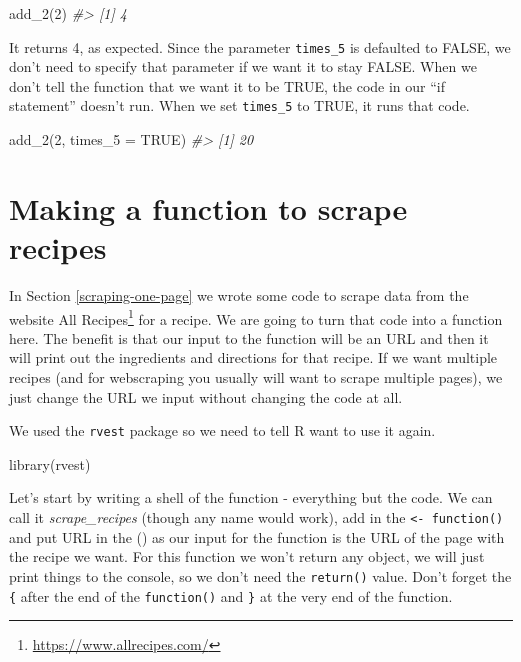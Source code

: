 \documentclass[
]{krantz}
\makeatletter
\newenvironment{Shaded}{\begin{snugshade}}{\end{snugshade}}
\newcommand{\AttributeTok}[1]{\textcolor[rgb]{0.61,0.61,0.61}{#1}}
\newcommand{\CommentTok}[1]{\textcolor[rgb]{0.37,0.37,0.37}{\textit{#1}}}
\newcommand{\ConstantTok}[1]{\textcolor[rgb]{0,0,0}{#1}}
\newcommand{\DecValTok}[1]{\textcolor[rgb]{0.06,0.06,0.06}{#1}}
\newcommand{\FunctionTok}[1]{\textcolor[rgb]{0,0,0}{#1}}
\newcommand{\NormalTok}[1]{#1}
\renewcommand{\href}[2]{#2\footnote{\url{#1}}}
\newenvironment{kframe}{%
\medskip{}
\setlength{\fboxsep}{.8em}
 \def\at@end@of@kframe{}%
 \ifinner\ifhmode%
  \def\at@end@of@kframe{\end{minipage}}%
  \begin{minipage}{\columnwidth}%
 \fi\fi%
 \def\FrameCommand##1{\hskip\@totalleftmargin \hskip-\fboxsep
 \colorbox{shadecolor}{##1}\hskip-\fboxsep
     \hskip-\linewidth \hskip-\@totalleftmargin \hskip\columnwidth}%
 \MakeFramed {\advance\hsize-\width
   \@totalleftmargin\z@ \linewidth\hsize
   \@setminipage}}%
 {\par\unskip\endMakeFramed%
 \at@end@of@kframe}
\renewenvironment{Shaded}{\begin{kframe}}{\end{kframe}}
\makeatother
\begin{document}
\begin{Shaded}
\begin{Highlighting}[]
\FunctionTok{add\_2}\NormalTok{(}\DecValTok{2}\NormalTok{)}
\CommentTok{\#\textgreater{} [1] 4}
\end{Highlighting}
\end{Shaded}

It returns 4, as expected. Since the parameter \texttt{times\_5} is defaulted to FALSE, we don't need to specify that parameter if we want it to stay FALSE. When we don't tell the function that we want it to be TRUE, the code in our ``if statement'' doesn't run. When we set \texttt{times\_5} to TRUE, it runs that code.

\begin{Shaded}
\begin{Highlighting}[]
\FunctionTok{add\_2}\NormalTok{(}\DecValTok{2}\NormalTok{, }\AttributeTok{times\_5 =} \ConstantTok{TRUE}\NormalTok{)}
\CommentTok{\#\textgreater{} [1] 20}
\end{Highlighting}
\end{Shaded}

\hypertarget{recipes-function}{%
\section{Making a function to scrape recipes}\label{recipes-function}}

In Section \ref{scraping-one-page} we wrote some code to scrape data from the website \href{https://www.allrecipes.com/}{All Recipes} for a recipe. We are going to turn that code into a function here. The benefit is that our input to the function will be an URL and then it will print out the ingredients and directions for that recipe. If we want multiple recipes (and for webscraping you usually will want to scrape multiple pages), we just change the URL we input without changing the code at all.

We used the \texttt{rvest} package so we need to tell R want to use it again.

\begin{Shaded}
\begin{Highlighting}[]
\FunctionTok{library}\NormalTok{(rvest)}
\end{Highlighting}
\end{Shaded}

Let's start by writing a shell of the function - everything but the code. We can call it \emph{scrape\_recipes} (though any name would work), add in the \texttt{\textless{}-\ function()} and put URL in the () as our input for the function is the URL of the page with the recipe we want. For this function we won't return any object, we will just print things to the console, so we don't need the \texttt{return()} value. Don't forget the \texttt{\{} after the end of the \texttt{function()} and \texttt{\}} at the very end of the function.
\end{document}
